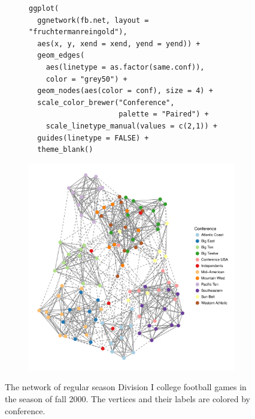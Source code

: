 \begin{figure}[hbtp]
\begin{subfigure}[t]{\textwidth}
\begin{adjustbox}{valign=t}
             \begin{minipage}{.49\textwidth}
 \begin{knitrout}\footnotesize
{}\color{fgcolor}\begin{kframe}
\begin{verbatim}
ggplot(
  ggnetwork(fb.net, layout = "fruchtermanreingold"),
  aes(x, y, xend = xend, yend = yend)) +
  geom_edges(
    aes(linetype = as.factor(same.conf)),
    color = "grey50") +
  geom_nodes(aes(color = conf), size = 4) +
  scale_color_brewer("Conference",
                     palette = "Paired") +
    scale_linetype_manual(values = c(2,1)) +
  guides(linetype = FALSE) +
  theme_blank()
\end{verbatim}
\end{kframe}
\end{knitrout} \vspace{1em}

                   \end{minipage}

                  \begin{minipage}{.49\textwidth}

\includegraphics[width=\textwidth]{figure/football_ggnetwork-1.pdf}

                          \end{minipage}

                          \end{adjustbox}
\end{subfigure}
\caption{\label{fig.cap:football} The network of regular season Division I college football games in the season of fall 2000. The vertices and their labels are colored by conference.}
\end{figure}
\afterpage{\clearpage}

